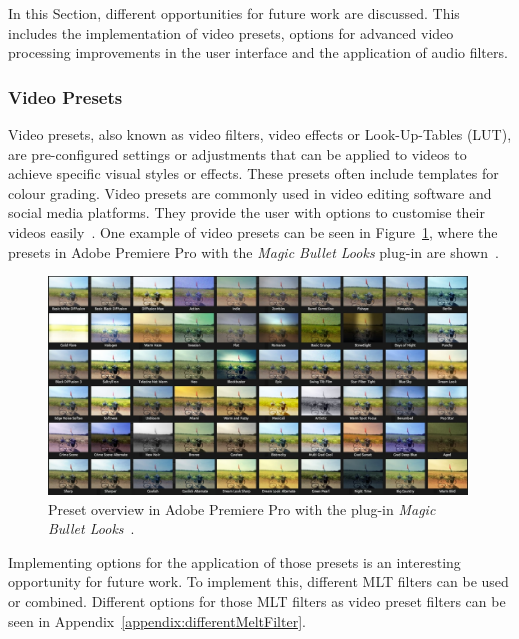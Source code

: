 \documentclass[../MasterThesis.tex]{subfiles}
\begin{document}
In this Section, different opportunities for future work are discussed. This includes the implementation of video presets, options for advanced video processing improvements in the user interface and the application of audio filters.


\subsubsection*{Video Presets}

Video presets, also known as video filters, video effects or Look-Up-Tables (LUT), are pre-configured settings or adjustments that can be applied to videos to achieve specific visual styles or effects. 
These presets often include templates for colour grading. 
Video presets are commonly used in video editing software and social media platforms. They provide the user with options to customise their videos easily~\cite{cc1}.
%
One example of video presets can be seen in Figure~\ref{figure:app}, where the presets in Adobe Premiere Pro with the \textit{Magic Bullet Looks} plug-in are shown~\cite{premierepro, magicbullet}.

\begin{figure}[H]
	
	\centering
	
	\includegraphics[width=0.99\textwidth]{app.jpg}
	
	\caption[Presets in Adobe Premiere Pro (\textit{Magic Bullet Looks}).]{Preset overview in Adobe Premiere Pro with the plug-in \textit{Magic Bullet Looks}~\cite{premierepro, magicbullet}.}
	\label{figure:app}
	
\end{figure}

Implementing options for the application of those presets is an interesting opportunity for future work. To implement this, different MLT filters can be used or combined. Different options for those MLT filters as video preset filters can be seen in Appendix~\ref{appendix:differentMeltFilter}.
\end{document}
